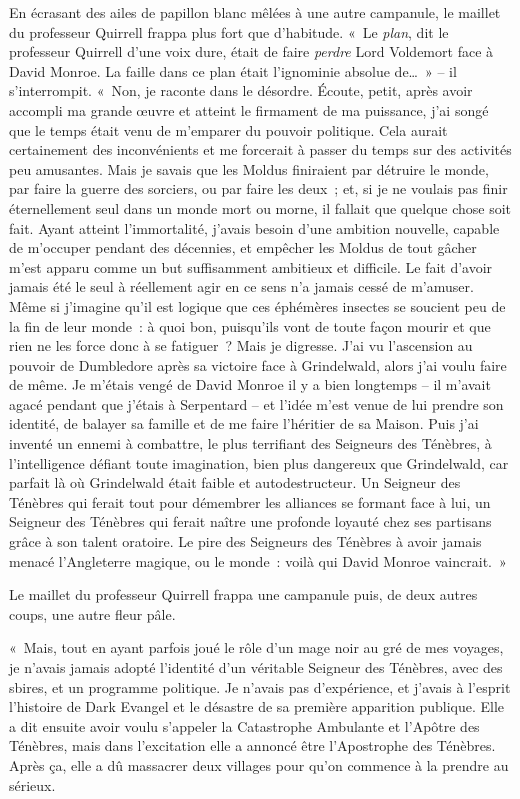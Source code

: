En écrasant des ailes de papillon blanc mêlées à une autre campanule, le maillet du professeur Quirrell frappa plus fort que d'habitude. «~Le \emph{plan}, dit le professeur Quirrell d'une voix dure, était de faire \emph{perdre} Lord Voldemort face à David Monroe. La faille dans ce plan était l'ignominie absolue de…~» -- il s'interrompit. «~Non, je raconte dans le désordre. Écoute, petit, après avoir accompli ma grande œuvre et atteint le firmament de ma puissance, j'ai songé que le temps était venu de m'emparer du pouvoir politique. Cela aurait certainement des inconvénients et me forcerait à passer du temps sur des activités peu amusantes. Mais je savais que les Moldus finiraient par détruire le monde, par faire la guerre des sorciers, ou par faire les deux~; et, si je ne voulais pas finir éternellement seul dans un monde mort ou morne, il fallait que quelque chose soit fait. Ayant atteint l'immortalité, j'avais besoin d'une ambition nouvelle, capable de m'occuper pendant des décennies, et empêcher les Moldus de tout gâcher m'est apparu comme un but suffisamment ambitieux et difficile. Le fait d'avoir jamais été le seul à réellement agir en ce sens n'a jamais cessé de m'amuser. Même si j'imagine qu'il est logique que ces éphémères insectes se soucient peu de la fin de leur monde~: à quoi bon, puisqu'ils vont de toute façon mourir et que rien ne les force donc à se fatiguer~? Mais je digresse. J'ai vu l'ascension au pouvoir de Dumbledore après sa victoire face à Grindelwald, alors j'ai voulu faire de même. Je m'étais vengé de David Monroe il y a bien longtemps -- il m'avait agacé pendant que j'étais à Serpentard -- et l'idée m'est venue de lui prendre son identité, de balayer sa famille et de me faire l'héritier de sa Maison. Puis j'ai inventé un ennemi à combattre, le plus terrifiant des Seigneurs des Ténèbres, à l'intelligence défiant toute imagination, bien plus dangereux que Grindelwald, car parfait là où Grindelwald était faible et autodestructeur. Un Seigneur des Ténèbres qui ferait tout pour démembrer les alliances se formant face à lui, un Seigneur des Ténèbres qui ferait naître une profonde loyauté chez ses partisans grâce à son talent oratoire. Le pire des Seigneurs des Ténèbres à avoir jamais menacé l'Angleterre magique, ou le monde~: voilà qui David Monroe vaincrait.~»

Le maillet du professeur Quirrell frappa une campanule puis, de deux autres coups, une autre fleur pâle.

«~Mais, tout en ayant parfois joué le rôle d'un mage noir au gré de mes voyages, je n'avais jamais adopté l'identité d'un véritable Seigneur des Ténèbres, avec des sbires, et un programme politique. Je n'avais pas d'expérience, et j'avais à l'esprit l'histoire de Dark Evangel et le désastre de sa première apparition publique. Elle a dit ensuite avoir voulu s'appeler la Catastrophe Ambulante et l'Apôtre des Ténèbres, mais dans l'excitation elle a annoncé être l'Apostrophe des Ténèbres. Après ça, elle a dû massacrer deux villages pour qu'on commence à la prendre au sérieux.

